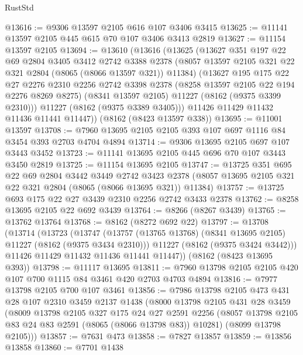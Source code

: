 \begin{lexlean}{RustStd}
\begin{coremodule}
@13616 := @9306 @13597 @2105 @616 @107 @3406 @3415
@13625 := @11141 @13597 @2105 @445 @615 @70 @107 @3406 @3413 @2819
@13627 := @11154 @13597 @2105
@13694 := @13610
    (@13616
      (@13625
        (@13627
          @351
          @197
          @22
          @69
          @2804
          @3405
          @3412
          @2742
          @3388
          @2378
          (@8057 @13597 @2105 @321 @22 @321 @2804 (@8065 (@8066 @13597 @321)) @11384)
          (@13627
            @195
            @175
            @22
            @27
            @2276
            @2310
            @2256
            @2742
            @3398
            @2378
            (@8258 @13597 @2105 @22 @194 @2276 @8269 @8275)
            (@8341 @13597 @2105)
            @11227
            (@8162 (@9375 @3399 @2310)))
          @11227
          (@8162 (@9375 @3389 @3405)))
        @11426
        @11429
        @11432
        @11436
        @11441
        @11447))
    (@8162 (@8423 @13597 @338))
@13695 := @11001 @13597
@13708 := @7960 @13695 @2105 @2105 @393 @107 @697 @1116 @84 @3454 @393 @2703 @4704 @4894
@13714 := @9306 @13695 @2105 @697 @107 @3443 @3452
@13723 := @11141 @13695 @2105 @445 @696 @70 @107 @3443 @3450 @2819
@13725 := @11154 @13695 @2105
@13747 := @13725
    @351
    @695
    @22
    @69
    @2804
    @3442
    @3449
    @2742
    @3423
    @2378
    (@8057 @13695 @2105 @321 @22 @321 @2804 (@8065 (@8066 @13695 @321)) @11384)
@13757 := @13725 @693 @175 @22 @27 @3439 @2310 @2256 @2742 @3433 @2378
@13762 := @8258 @13695 @2105 @22 @692 @3439
@13764 := @8266 (@8267 @3439)
@13765 := @13762 @13764
@13768 := @8162 (@8272 @692 @22)
@13797 := @13708
    (@13714
      (@13723
        (@13747
          (@13757 (@13765 @13768) (@8341 @13695 @2105) @11227 (@8162 (@9375 @3434 @2310)))
          @11227
          (@8162 (@9375 @3424 @3442)))
        @11426
        @11429
        @11432
        @11436
        @11441
        @11447))
    (@8162 (@8423 @13695 @393))
@13798 := @11117 @13695
@13811 := @7960 @13798 @2105 @2105 @420 @107 @700 @1115 @84 @3461 @420 @2703 @4703 @4894
@13816 := @7977 @13798 @2105 @700 @107 @3461
@13856 := @7986
    @13798
    @2105
    @473
    @431
    @28
    @107
    @2310
    @3459
    @2137
    @1438
    (@8000
      @13798
      @2105
      @431
      @28
      @3459
      (@8009
        @13798
        @2105
        @327
        @175
        @24
        @27
        @2591
        @2256
        (@8057 @13798 @2105 @83 @24 @83 @2591 (@8065 (@8066 @13798 @83)) @10281)
        (@8099 @13798 @2105)))
@13857 := @7631 @473
@13858 := @7827 @13857
@13859 := @13856 @13858
@13860 := @7701 @1438

\end{coremodule}
\end{lexlean}
